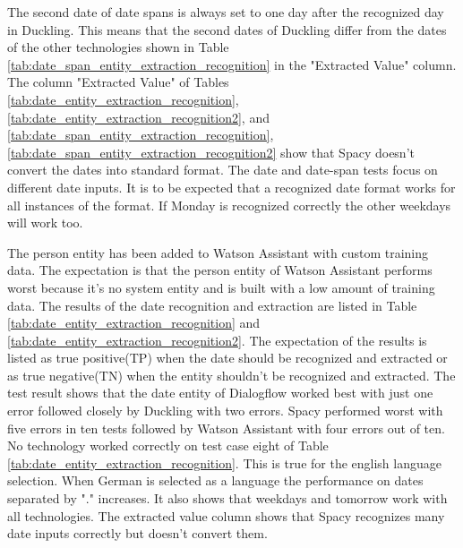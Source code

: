 The second date of date spans is always set to one day after the recognized day in Duckling.
This means that the second dates of Duckling differ from the dates of the other technologies
shown in Table \ref{tab:date_span_entity_extraction_recognition} in the "Extracted Value" column.
The column "Extracted Value" of Tables \ref{tab:date_entity_extraction_recognition},
\ref{tab:date_entity_extraction_recognition2},
and \ref{tab:date_span_entity_extraction_recognition},
\ref{tab:date_span_entity_extraction_recognition2} show that Spacy doesn't 
convert the dates into standard format.
The date and date-span tests focus on different date inputs.
It is to be expected that a recognized date format works for 
all instances of the format.
If Monday is recognized correctly the other weekdays will work too. 

The person entity has been added to Watson Assistant with custom training data.
The expectation is that the person entity of Watson Assistant performs worst because 
it's no system entity and is built with a low amount of training data.
The results of the date recognition and extraction are listed in Table \ref{tab:date_entity_extraction_recognition}
and \ref{tab:date_entity_extraction_recognition2}.
The expectation of the results is listed as true positive(TP) when the date should be recognized and extracted or as true negative(TN)
when the entity shouldn't be recognized and extracted.
The test result shows that the date entity of Dialogflow worked best with just one error
followed closely by Duckling with two errors.
Spacy performed worst with five errors in ten tests followed by Watson Assistant with four errors out of ten.
No technology worked correctly on test case eight of Table \ref{tab:date_entity_extraction_recognition}.
This is true for the english language selection.
When German is selected as a language the performance on dates separated by
"." increases.
It also shows that weekdays and tomorrow work with all technologies.
The extracted value column shows that Spacy recognizes many date inputs correctly but doesn't convert them.

